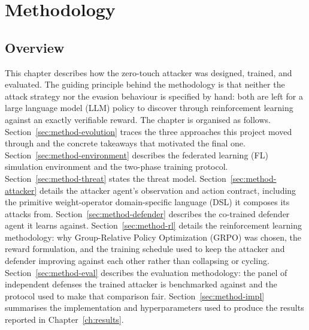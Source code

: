 
\chapter{Methodology}
\label{ch:methodology}

\section{Overview}
\label{sec:method-overview}

This chapter describes how the zero-touch attacker was designed, trained, and evaluated. The guiding principle behind the methodology is that neither the attack strategy nor the evasion behaviour is specified by hand: both are left for a large language model (LLM) policy to discover through reinforcement learning against an exactly verifiable reward. The chapter is organised as follows. Section~\ref{sec:method-evolution} traces the three approaches this project moved through and the concrete takeaways that motivated the final one. Section~\ref{sec:method-environment} describes the federated learning (FL) simulation environment and the two-phase training protocol. Section~\ref{sec:method-threat} states the threat model. Section~\ref{sec:method-attacker} details the attacker agent's observation and action contract, including the primitive weight-operator domain-specific language (DSL) it composes its attacks from. Section~\ref{sec:method-defender} describes the co-trained defender agent it learns against. Section~\ref{sec:method-rl} details the reinforcement learning methodology: why Group-Relative Policy Optimization (GRPO) was chosen, the reward formulation, and the training schedule used to keep the attacker and defender improving against each other rather than collapsing or cycling. Section~\ref{sec:method-eval} describes the evaluation methodology: the panel of independent defenses the trained attacker is benchmarked against and the protocol used to make that comparison fair. Section~\ref{sec:method-impl} summarises the implementation and hyperparameters used to produce the results reported in Chapter~\ref{ch:results}.

